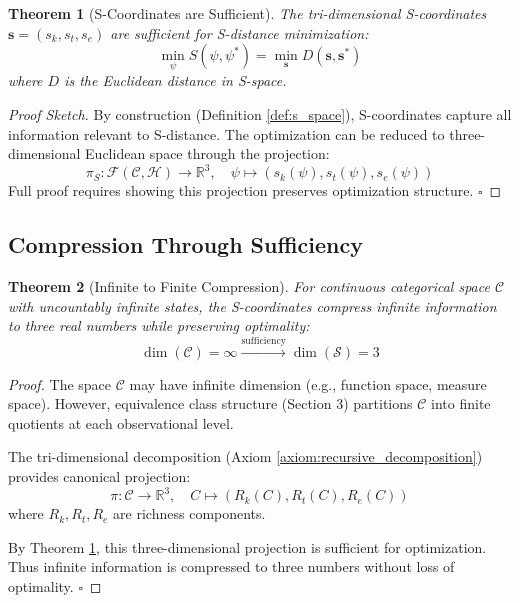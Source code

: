\documentclass[12pt,a4paper]{article}
\newtheorem{theorem}{Theorem}[section]
\begin{document}
\begin{theorem}[S-Coordinates are Sufficient]
\label{thm:s_sufficient}
The tri-dimensional S-coordinates $\mathbf{s} = (s_k, s_t, s_e)$ are sufficient for S-distance minimization:
\begin{equation}
\min_{\psi} S(\psi, \psi^*) = \min_{\mathbf{s}} D(\mathbf{s}, \mathbf{s}^*)
\end{equation}
where $D$ is the Euclidean distance in S-space.
\end{theorem}

\begin{proof}[Proof Sketch]
By construction (Definition \ref{def:s_space}), S-coordinates capture all information relevant to S-distance. The optimization can be reduced to three-dimensional Euclidean space through the projection:
\begin{equation}
\pi_S: \mathcal{F}(\mathcal{C}, \mathcal{H}) \to \mathbb{R}^3, \quad \psi \mapsto (s_k(\psi), s_t(\psi), s_e(\psi))
\end{equation}
Full proof requires showing this projection preserves optimization structure. $\square$
\end{proof}

\subsection{Compression Through Sufficiency}

\begin{theorem}[Infinite to Finite Compression]
\label{thm:infinite_compression}
For continuous categorical space $\mathcal{C}$ with uncountably infinite states, the S-coordinates compress infinite information to three real numbers while preserving optimality:
\begin{equation}
\dim(\mathcal{C}) = \infty \xrightarrow{\text{sufficiency}} \dim(\mathcal{S}) = 3
\end{equation}
\end{theorem}

\begin{proof}
The space $\mathcal{C}$ may have infinite dimension (e.g., function space, measure space). However, equivalence class structure (Section 3) partitions $\mathcal{C}$ into finite quotients at each observational level.

The tri-dimensional decomposition (Axiom \ref{axiom:recursive_decomposition}) provides canonical projection:
\begin{equation}
\pi: \mathcal{C} \to \mathbb{R}^3, \quad C \mapsto (R_k(C), R_t(C), R_e(C))
\end{equation}
where $R_k, R_t, R_e$ are richness components.

By Theorem \ref{thm:s_sufficient}, this three-dimensional projection is sufficient for optimization. Thus infinite information is compressed to three numbers without loss of optimality. $\square$
\end{proof}
\end{document}
